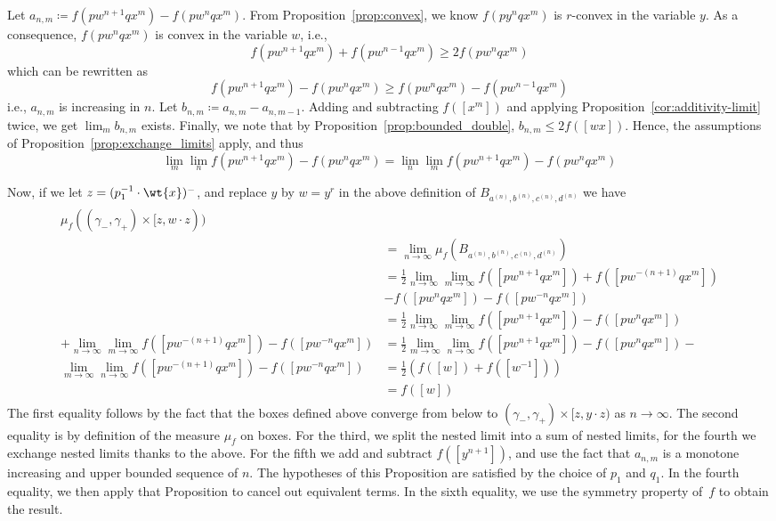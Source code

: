 Let $a_{n,m} \coloneqq f(pw^{n+1}qx^m) - f(pw^{n}qx^m)$.
From Proposition~\ref{prop:convex}, we know $f(py^{n}qx^m)$ is $r$-convex in the variable $y$.
As a consequence, $f(pw^{n}qx^m)$ is convex in the variable $w$, i.e., 
\[
f(pw^{n+1}qx^m) + f(pw^{n-1}qx^m) \geq 2f(pw^{n}qx^m)
\]
which can be rewritten as
\[
f(pw^{n+1}qx^m) - f(pw^{n}qx^m) \geq f(pw^{n}qx^m) - f(pw^{n-1}qx^m)
\]
i.e., $a_{n,m}$ is increasing in $n$.
Let $b_{n,m} \coloneqq a_{n,m} - a_{n,m-1}$.
Adding and subtracting $f([x^m])$ and applying Proposition~\ref{cor:additivity-limit} twice, we get $\lim_{m} b_{n,m}$ exists.
Finally, we note that by Proposition~\ref{prop:bounded_double}, $b_{n,m} \leq 2f([wx])$.
Hence, the assumptions of Proposition~\ref{prop:exchange_limits} apply, and thus
\[
\lim_m \lim_n f(pw^{n+1}qx^m) - f(pw^{n}qx^m) = \lim_n \lim_m f(pw^{n+1}qx^m) - f(pw^{n}qx^m)
\]

Now, if we let $z=(p_1^{-1} \cdot \wt{x})^-$, and replace $y$ by $w=y^r$ in the above definition of $B_{a^{(n)}, b^{(n)}, c^{(n)}, d^{(n)}}$ we have
    \begin{multline*}
      \begin{aligned}
      \mu_f((\gamma_-,\gamma_+) \times [z,w \cdot z)) \\
    &= \lim_{n\to\infty} \mu_f(B_{a^{(n)}, b^{(n)}, c^{(n)}, d^{(n)}})  \\
    &= \frac{1}{2}\lim_{n\to\infty} \lim_{m\to\infty}f([pw^{n+1}qx^{m}]) + f([pw^{-(n+1)}qx^{m}])\\
    &-f([pw^{n}qx^{m}]) - f([pw^{-n}qx^{m}]) \\
    &= \frac{1}{2}\lim_{n\to\infty} \lim_{m\to\infty}f([pw^{n+1}qx^{m}]) -f([pw^{n}qx^{m}])  \\
     + \lim_{n\to\infty} \lim_{m\to\infty}  f([pw^{-(n+1)}qx^{m}]) - f([pw^{-n}qx^{m}])
    &= \frac{1}{2}\lim_{m\to\infty} \lim_{n\to\infty}f([pw^{n+1}qx^{m}]) -f([pw^{n}qx^{m}]) -  \\
      \lim_{m\to\infty} \lim_{n\to\infty}  f([pw^{-(n+1)}qx^{m}]) - f([pw^{-n}qx^{m}])
    &= \frac{1}{2}(f([w]) + f([w^{-1}]))\\
    &=f([w])
      \end{aligned}
    \end{multline*}      The first equality follows by the fact that the boxes defined above converge from below to $(\gamma_-,\gamma_+) \times [z,y
      \cdot z)$ as $n \to \infty$. The second equality is by
      definition of the measure $\mu_f$ on boxes.
      For the third, we split the nested limit into a sum of nested limits, for the fourth we exchange nested limits thanks to the above. For the fifth we add and subtract $f([y^{n+1}])$, and use the fact that $a_{n,m}$ is a monotone increasing and upper bounded sequence of $n$.
       The hypotheses of this Proposition are satisfied by the choice of $p_1$ and $q_1$.
      In the fourth equality, we then apply that
      Proposition to cancel out equivalent
      terms. In the sixth equality, we use the symmetry property of~$f$ to obtain the result.